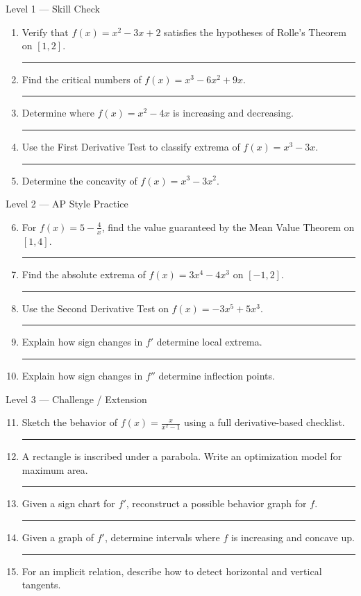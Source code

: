 \documentclass[11pt]{article}
\newcommand{\hwspace}{\vspace{0.8em}\hrule\vspace{0.8em}}
\begin{document}
\begin{homeworkset}{Level 1 --- Skill Check}
\begin{enumerate}
    \item Verify that $f(x)=x^2-3x+2$ satisfies the hypotheses of Rolle’s Theorem on $[1,2]$.
    \hwspace

    \item Find the critical numbers of $f(x)=x^3-6x^2+9x$.
    \hwspace

    \item Determine where $f(x)=x^2-4x$ is increasing and decreasing.
    \hwspace

    \item Use the First Derivative Test to classify extrema of $f(x)=x^3-3x$.
    \hwspace

    \item Determine the concavity of $f(x)=x^3-3x^2$.
\end{enumerate}
\end{homeworkset}

\begin{homeworkset}{Level 2 --- AP Style Practice}
\begin{enumerate}
\setcounter{enumi}{5}
    \item For $f(x)=5-\frac4x$, find the value guaranteed by the Mean Value Theorem on $[1,4]$.
    \hwspace

    \item Find the absolute extrema of $f(x)=3x^4-4x^3$ on $[-1,2]$.
    \hwspace

    \item Use the Second Derivative Test on $f(x)=-3x^5+5x^3$.
    \hwspace

    \item Explain how sign changes in $f'$ determine local extrema.
    \hwspace

    \item Explain how sign changes in $f''$ determine inflection points.
\end{enumerate}
\end{homeworkset}

\begin{homeworkset}{Level 3 --- Challenge / Extension}
\begin{enumerate}
\setcounter{enumi}{10}
    \item Sketch the behavior of $f(x)=\frac{x}{x^2-1}$ using a full derivative-based checklist.
    \hwspace

    \item A rectangle is inscribed under a parabola. Write an optimization model for maximum area.
    \hwspace

    \item Given a sign chart for $f'$, reconstruct a possible behavior graph for $f$.
    \hwspace

    \item Given a graph of $f'$, determine intervals where $f$ is increasing and concave up.
    \hwspace

    \item For an implicit relation, describe how to detect horizontal and vertical tangents.
\end{enumerate}
\end{homeworkset}
\end{document}
